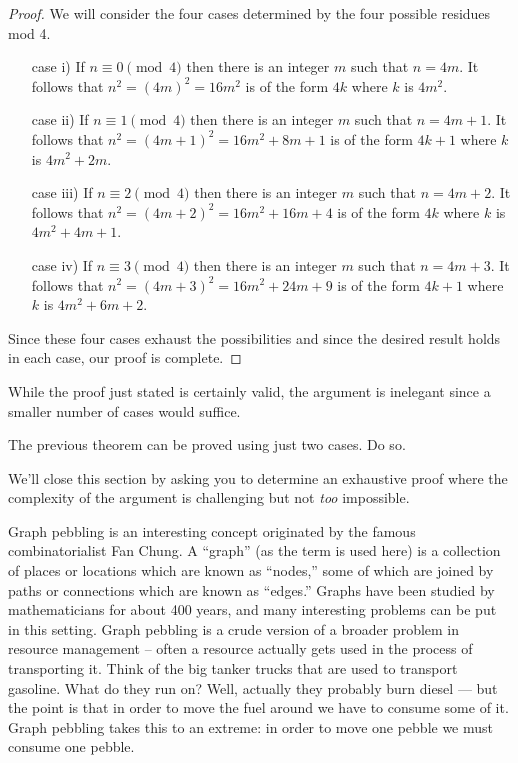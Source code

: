 \begin{proof}
We will consider the four cases determined by the four
possible residues mod 4.

\begin{itemize}
\item[case i)] If $n \equiv 0 \pmod{4}$ then there is an integer $m$
such that $n = 4m$.  It follows that $n^2 = (4m)^2 = 16m^2$ is of the 
form $4k$ where $k$ is $4m^2$.

\item[case ii)] If $n \equiv 1 \pmod{4}$ then there is an integer $m$
such that $n = 4m+1$.  It follows that $n^2 = (4m+1)^2 = 16m^2 + 8m + 1$ 
is of the form $4k+1$ where $k$ is $4m^2+2m$.

\item[case iii)] If $n \equiv 2 \pmod{4}$ then there is an integer $m$
such that $n = 4m+2$.  It follows that $n^2 = (4m+2)^2 = 16m^2 + 16m + 4$ 
is of the form $4k$ where $k$ is $4m^2+4m+1$.

\item[case iv)] If $n \equiv 3 \pmod{4}$ then there is an integer $m$
such that $n = 4m+3$.  It follows that $n^2 = (4m+3)^2 = 16m^2 + 24m + 9$ 
is of the form $4k+1$ where $k$ is $4m^2+6m+2$.
\end{itemize}

Since these four cases exhaust the possibilities and since the desired
result holds in each case, our proof is complete.

\end{proof} 

While the proof just stated is certainly valid, the argument is inelegant
since a smaller number of cases would suffice.

\begin{exer}
The previous theorem can be proved using just two cases.  Do so.
\end{exer}

We'll close this section by asking you to determine an exhaustive proof where 
the complexity of the argument is challenging but not \emph{too} impossible.

 Graph pebbling is an interesting concept originated 
by the famous combinatorialist  Fan Chung.  A ``graph'' 
(as the term is used here) is a collection
of places or locations which are known as ``nodes,'' some of which 
are joined by paths or connections which are known as ``edges.'' 
Graphs have been studied by mathematicians for about 400 years, and 
many interesting problems can be put in this setting.  Graph pebbling
is a crude version of a broader problem in resource management -- often
a resource actually gets used in the process of transporting it.  Think of
the big tanker trucks that are used to transport gasoline.  What do they
run on?  Well, actually they probably burn diesel --- but the point is
that in order to move the fuel around we have to consume some of it.
Graph pebbling takes this to an extreme: in order to move one pebble
we must consume one pebble.  

